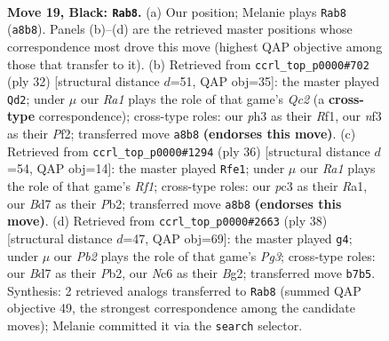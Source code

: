 \documentclass[11pt]{article}
\begin{document}
\clearpage

\begin{figure}[p]\centering
\begin{subfigure}{0.46\textwidth}\centering
\resizebox{\linewidth}{!}{%
\newchessgame
\chessboard[
  setfen={r2r2k1/1p1bqppp/2n1p3/p1Pp4/3P4/P1P2N1P/RQ2BPP1/2R3K1 b - - 5 19},
  showmover=false,
  pgfstyle=straightmove, color=movearrow, markmove={a8-b8}
]}
\caption{}
\end{subfigure}\hfill
\begin{subfigure}{0.46\textwidth}\centering
\resizebox{\linewidth}{!}{%
\newchessgame
\chessboard[
  setfen={r1b1r2k/pp2qpp1/2p2n1p/3p4/3P4/2NBP3/PPQ2PPP/1R3RK1 w - - 4 17},
  showmover=false,
  pgfstyle=straightmove, color=movearrow, markmove={c2-d2}
]}
\caption{}
\end{subfigure}
\\[4pt]
\begin{subfigure}{0.46\textwidth}\centering
\resizebox{\linewidth}{!}{%
\newchessgame
\chessboard[
  setfen={r2q2k1/1p1b2pp/3ppr2/p2p1n2/P2P4/2PB1N2/1P1Q1PPP/R4RK1 w - - 2 19},
  showmover=false,
  pgfstyle=straightmove, color=movearrow, markmove={f1-e1}
]}
\caption{}
\end{subfigure}\hfill
\begin{subfigure}{0.46\textwidth}\centering
\resizebox{\linewidth}{!}{%
\newchessgame
\chessboard[
  setfen={5rk1/1pq1np2/p2r1bpp/3p4/P1pP1P2/2N1P1P1/1P2Q1BP/R4R1K w - - 2 20},
  showmover=false,
  pgfstyle=straightmove, color=movearrow, markmove={g3-g4}
]}
\caption{}
\end{subfigure}
\caption{\textbf{Move 19, Black: \texttt{Rab8}.} (a) Our position; Melanie plays \texttt{Rab8} (\texttt{a8b8}). Panels (b)--(d) are the retrieved master positions whose correspondence most drove this move (highest QAP objective among those that transfer to it). (b) Retrieved from \texttt{ccrl\_top\_p0000\#702} (ply 32) [structural distance $d$=51, QAP obj=35]: the master played \texttt{Qd2}; under $\mu$ our \emph{Ra1} plays the role of that game's \emph{Qc2} (a \textbf{cross-type} correspondence); cross-type roles: our \emph{p}h3 as their \emph{R}f1, our \emph{n}f3 as their \emph{P}f2; transferred move \texttt{a8b8} \textbf{(endorses this move)}. (c) Retrieved from \texttt{ccrl\_top\_p0000\#1294} (ply 36) [structural distance $d$=54, QAP obj=14]: the master played \texttt{Rfe1}; under $\mu$ our \emph{Ra1} plays the role of that game's \emph{Rf1}; cross-type roles: our \emph{p}c3 as their \emph{R}a1, our \emph{B}d7 as their \emph{P}b2; transferred move \texttt{a8b8} \textbf{(endorses this move)}. (d) Retrieved from \texttt{ccrl\_top\_p0000\#2663} (ply 38) [structural distance $d$=47, QAP obj=69]: the master played \texttt{g4}; under $\mu$ our \emph{Pb2} plays the role of that game's \emph{Pg3}; cross-type roles: our \emph{B}d7 as their \emph{P}b2, our \emph{N}c6 as their \emph{B}g2; transferred move \texttt{b7b5}. Synthesis: 2 retrieved analogs transferred to \texttt{Rab8} (summed QAP objective 49, the strongest correspondence among the candidate moves); Melanie committed it via the \texttt{search} selector.}
\label{fig:thought-m37}
\end{figure}
\end{document}
